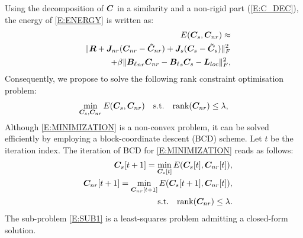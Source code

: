 Using the decomposition of $\boldsymbol{C}$ in a similarity and a
non-rigid part (\cref{E:C_DEC}), the energy of \cref{E:ENERGY} is written as:
\begin{eqnarray*}%
    &&E(\matr{C}_s,  \matr{C}_{nr} ) \approx \\
    &    &\norm{ \matr{R} + \matr{J}_{nr} (\matr{C}_{nr} - \matr{\tilde{C}}_{nr}) + \matr{J}_{s} (\matr{C}_{s} - \matr{\tilde{C}}_{s}) }_F^2 \nonumber \\
    &     &+ \beta \norm{{\matr{B}_\ell}_{nr} \matr{C}_{nr} - {\matr{B}_\ell}_{s} \matr{C}_{s} - \matr{L}_{loc}}_F^2,
\end{eqnarray*}
Consequently, we propose to solve the following rank constraint optimisation problem:
\begin{equation}\label{E:MINIMIZATION}
    \min_{\boldsymbol{C}_s,  \boldsymbol{C}_{nr}} E(\boldsymbol{C}_s,  \boldsymbol{C}_{nr} ) \quad \mbox{s.t.} \quad \mbox{rank}(\boldsymbol{C}_{nr}) \leq \lambda,
\end{equation}
Although \cref{E:MINIMIZATION} is a non-convex problem, it can be solved efficiently
by employing a block-coordinate descent (BCD) scheme. Let $t$ be the iteration index. The
iteration of BCD for \cref{E:MINIMIZATION} reads as follows:
\begin{eqnarray}
    & &\boldsymbol{C}_s[t+1] =  \min_{\boldsymbol{C}_s[t]} E(\boldsymbol{C}_s[t],  \boldsymbol{C}_{nr}[t] ), \label{E:SUB1} \\
    & & \boldsymbol{C}_{nr}[t+1] =  \min_{\boldsymbol{C}_{nr}[t+1]} E(\boldsymbol{C}_s[t+1],  \boldsymbol{C}_{nr}[t] ), \nonumber \\
    & &\quad \mbox{s.t.} \quad \mbox{rank}(\boldsymbol{C}_{nr}) \leq \lambda. \label{E:SUB2}
\end{eqnarray}
The sub-problem \cref{E:SUB1} is a least-squares problem admitting a closed-form solution.


